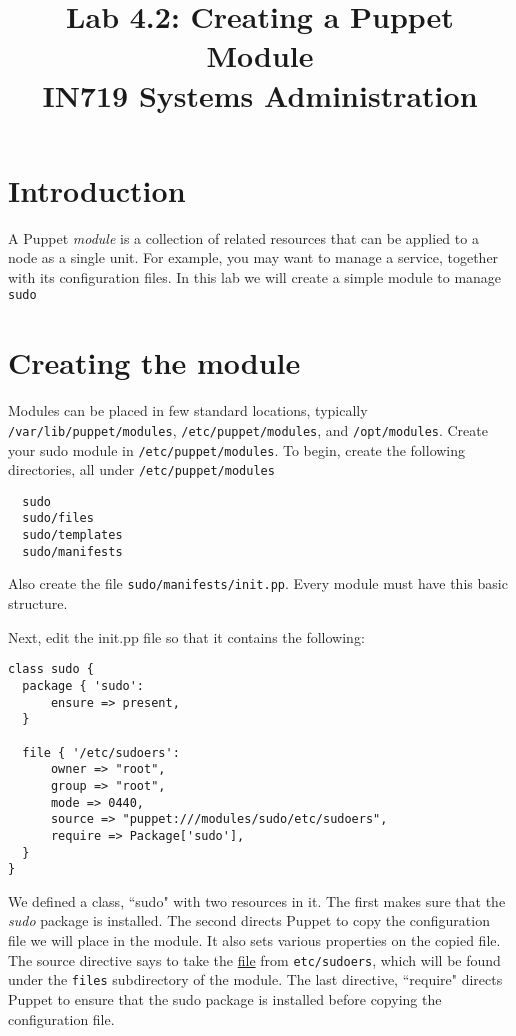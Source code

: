 \documentclass{article}   	%
\title{Lab 4.2: Creating a Puppet Module \\ IN719 Systems Administration}
\date{}
\begin{document}
\maketitle

\section*{Introduction}
A Puppet \emph{module} is a collection of related resources that can be applied to a node as a single unit. For example, you may want to manage a service, together with its configuration files.  In this lab we will create a simple module to manage \texttt{sudo}

\section*{Creating the module}
Modules can be placed in few standard locations, typically \texttt{/var/lib/puppet/modules}, \texttt{/etc/puppet/modules}, and \texttt{/opt/modules}.  Create your sudo module in \texttt{/etc/puppet/modules}.  To begin, create the following directories, all under \texttt{/etc/puppet/modules}
\begin{verbatim}
  sudo
  sudo/files
  sudo/templates
  sudo/manifests
\end{verbatim}
Also create the file \texttt{sudo/manifests/init.pp}.  Every module must have this basic structure.

Next, edit the init.pp file so that it contains the following:

\newpage

\begin{verbatim}
class sudo {
  package { 'sudo':
      ensure => present,
  }

  file { '/etc/sudoers':
      owner => "root",
      group => "root",
      mode => 0440,
      source => "puppet:///modules/sudo/etc/sudoers",
      require => Package['sudo'],
  }
}
\end{verbatim}

We defined a class, ``sudo" with two resources in it.  The first makes sure that the \emph{sudo} package is installed.  The second directs Puppet to copy the configuration file we will place in the module.  It also sets various properties on the copied file.  The source directive says to take the \underline{file} from \texttt{etc/sudoers}, which will be found under the \texttt{files} subdirectory of the module.  The last directive, ``require" directs Puppet to ensure that the sudo package is installed before copying the configuration file.
\end{document}
